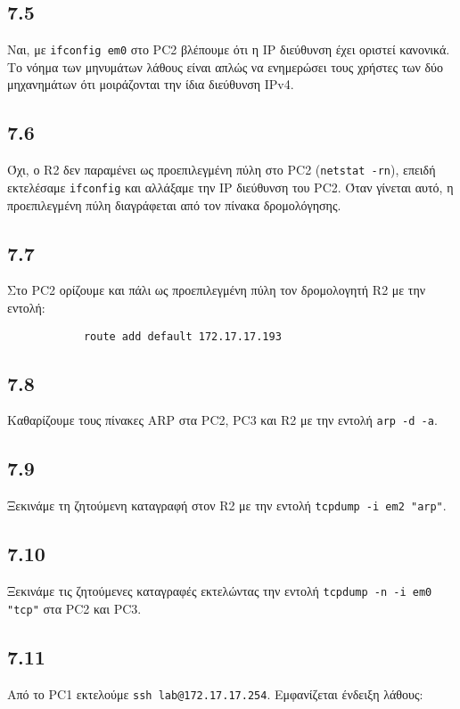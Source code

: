 \documentclass[a4paper, 12pt]{article}
\begin{document}
	\subsection*{7.5}
		Ναι, με \verb|ifconfig em0| στο PC2 βλέπουμε ότι η IP διεύθυνση έχει οριστεί κανονικά. Το νόημα των μηνυμάτων λάθους είναι απλώς να ενημερώσει τους χρήστες των δύο μηχανημάτων ότι μοιράζονται την ίδια διεύθυνση IPv4.

	\subsection*{7.6}
		Όχι, ο R2 δεν παραμένει ως προεπιλεγμένη πύλη στο PC2 (\verb|netstat -rn|), επειδή εκτελέσαμε \verb|ifconfig| και αλλάξαμε την IP διεύθυνση του PC2. Όταν γίνεται αυτό, η προεπιλεγμένη πύλη διαγράφεται από τον πίνακα δρομολόγησης.

	\subsection*{7.7}
		Στο PC2 ορίζουμε και πάλι ως προεπιλεγμένη πύλη τον δρομολογητή R2 με την εντολή: 
		
		\begin{verbatim}
			route add default 172.17.17.193
		\end{verbatim}

	\subsection*{7.8}
		Καθαρίζουμε τους πίνακες ARP στα PC2, PC3 και R2 με την εντολή \verb|arp -d -a|.

	\subsection*{7.9}
		Ξεκινάμε τη ζητούμενη καταγραφή στον R2 με την εντολή \verb|tcpdump -i em2 "arp"|.

	\subsection*{7.10}
		Ξεκινάμε τις ζητούμενες καταγραφές εκτελώντας την εντολή \verb|tcpdump -n -i em0 "tcp"| στα PC2 και PC3.

	\subsection*{7.11}
		Από το PC1 εκτελούμε \verb|ssh lab@172.17.17.254|. Εμφανίζεται ένδειξη λάθους:
		
\end{document}
